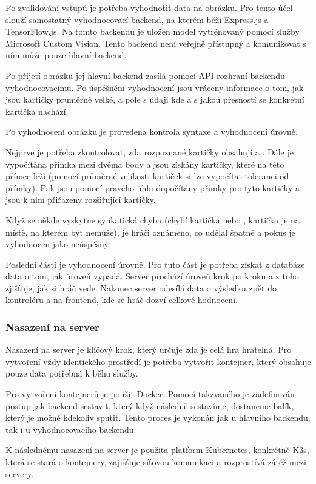 Po zvalidování vstupů je potřeba vyhodnotit data na obrázku. Pro tento účel slouží samostatný vyhodnocovací backend, na kterém běží Express.js a TensorFlow.js. Na tomto backendu je uložen model vytrénovaný pomocí služby Microsoft Custom Vision. Tento backend není veřejně přístupný a komunikovat s ním může pouze hlavní backend.\par
Po přijetí obrázku jej hlavní backend zasílá pomocí API rozhraní backendu vyhodnocovacímu. Po úspěšném vyhodnocení jsou vráceny informace o tom, jak jsou kartičky průměrně velké, a pole s údaji kde a s jakou přesností se konkrétní kartička nachází.

Po vyhodnocení obrázku je provedena kontrola syntaxe a vyhodnocení úrovně.\par
Nejprve je potřeba zkontrolovat, zda rozpoznané kartičky obsahují  a . Dále je vypočítána přímka mezi dvěma body a jsou získány kartičky, které na této přímce leží (pomocí průměrné velikosti kartiček si lze vypočítat toleranci od přímky). Pak jsou pomocí pravého úhlu dopočítány přímky pro tyto kartičky a jsou k nim přiřazeny rozšiřující kartičky.\par
Když se někde vyskytne synkatická chyba (chybí kartička  nebo , kartička je na místě, na kterém být nemůže), je hráči oznámeno, co udělal špatně a pokus je vyhodnocen jako neúspěšný.\par
Poslední částí je vyhodnocení úrovně. Pro tuto část je potřeba získat z databáze data o tom, jak úroveň vypadá. Server prochází úroveň krok po kroku a z toho zjišťuje, jak si hráč vede. Nakonec server odesílá data o výsledku zpět do kontroléru a na frontend, kde se hráč dozví celkové hodnocení.

\subsubsection{Nasazení na server}
Nasazení na server je klíčový krok, který určuje zda je celá hra hratelná.
Pro vytvoření vždy identického prostředí je potřeba vytvořit kontejner, který obsahuje pouze data potřebná k běhu služby.\par
Pro vytvoření kontejnerů je použit Docker. Pomocí takzvaného  je zadefinován postup jak backend sestavit, který když následně sestavíme, dostaneme balík, který je možné kdekoliv sputit. Tento proces je vykonán jak u hlavního backendu, tak i u vyhodnocovacího backendu.\par
K následnému nasazení na server je použita platform Kubernetes, konkrétně K3s, která se stará o kontejnery, zajišťuje síťovou komunikaci a rozprostívá zátěž mezi servery.
